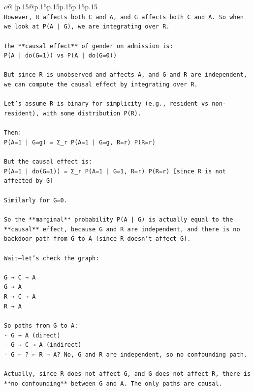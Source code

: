 \documentclass{article}
\begin{document}
{\begin{supertabular}{c@{$\;$}|p{.15\linewidth}@{}p{.15\linewidth}p{.15\linewidth}p{.15\linewidth}p{.15\linewidth}p{.15\linewidth}}
{{{\\ 
\texttt{However, R affects both C and A, and G affects both C and A. So when we look at P(A | G), we are integrating over R.} \\
\\ 
\texttt{The **causal effect** of gender on admission is:  } \\
\texttt{P(A | do(G=1)) vs P(A | do(G=0))} \\
\\ 
\texttt{But since R is unobserved and affects A, and G and R are independent, we can compute the causal effect by integrating over R.} \\
\\ 
\texttt{Let’s assume R is binary for simplicity (e.g., resident vs non{-}resident), with some distribution P(R).} \\
\\ 
\texttt{Then:} \\
\texttt{P(A=1 | G=g) = Σ\_r P(A=1 | G=g, R=r) P(R=r)} \\
\\ 
\texttt{But the causal effect is:} \\
\texttt{P(A=1 | do(G=1)) = Σ\_r P(A=1 | G=1, R=r) P(R=r)  {[}since R is not affected by G{]}} \\
\\ 
\texttt{Similarly for G=0.} \\
\\ 
\texttt{So the **marginal** probability P(A | G) is actually equal to the **causal** effect, because G and R are independent, and there is no backdoor path from G to A (since R doesn’t affect G).} \\
\\ 
\texttt{Wait—let’s check the graph:} \\
\\ 
\texttt{G → C → A  } \\
\texttt{G → A  } \\
\texttt{R → C → A  } \\
\texttt{R → A  } \\
\\ 
\texttt{So paths from G to A:} \\
\texttt{{-} G → A (direct)} \\
\texttt{{-} G → C → A (indirect)} \\
\texttt{{-} G ← ? ← R → A? No, G and R are independent, so no confounding path.} \\
\\ 
\texttt{Actually, since R does not affect G, and G does not affect R, there is **no confounding** between G and A. The only paths are causal.} \\
}}}
\end{supertabular}}
\end{document}

